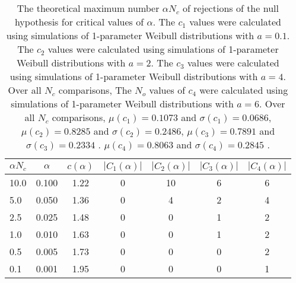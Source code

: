 \begin{table}[h!]
\begin{center}
\begin{tabular}{| l | c | c | c | c | c | c |}\hline
$\alpha N_c$ & $\alpha$ & $c(\alpha)$ & $|C_1(\alpha)|$ & $|C_2(\alpha)|$ & $|C_3(\alpha)|$ & $|C_4(\alpha)|$ \\\hline\hline
10.0 & 0.100 & 1.22 & 0 & 10 & 6 & 6 \\\hline
5.0 & 0.050 & 1.36 & 0 & 4 & 2 & 4 \\\hline
2.5 & 0.025 & 1.48 & 0 & 0 & 1 & 2 \\\hline
1.0 & 0.010 & 1.63 & 0 & 0 & 1 & 2 \\\hline
0.5 & 0.005 & 1.73 & 0 & 0 & 0 & 2 \\\hline
0.1 & 0.001 & 1.95 & 0 & 0 & 0 & 1 \\\hline
\end{tabular}
\caption{The theoretical maximum number $\alpha N_c$ of rejections
of the null hypothesis for critical values of $\alpha$.
The $c_1$ values were calculated using simulations of 1-parameter Weibull distributions with $a=0.1$.
The $c_2$ values were calculated using simulations of 1-parameter Weibull distributions with $a=2$.
The $c_3$ values were calculated using simulations of 1-parameter Weibull distributions with $a=4$.
Over all $N_c$ comparisons,
The $N_o$ values of $c_4$ were calculated using simulations of
 1-parameter Weibull distributions with $a=6$.
Over all $N_c$ comparisons,
 $\mu(c_1)=0.1073$ and $\sigma(c_1)=0.0686$,
 $\mu(c_2)=0.8285$ and $\sigma(c_2)=0.2486$,
 $\mu(c_3)=0.7891$ and $\sigma(c_3)=0.2334$ .
 $\mu(c_4)=0.8063$ and $\sigma(c_4)=0.2845$ .
}
\end{center}
\end{table}
